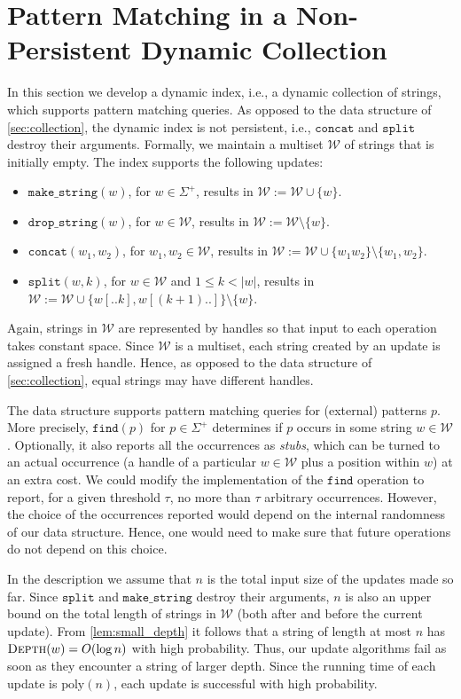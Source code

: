 \documentclass[a4paper]{article}
\theoremstyle{remark}
\newcommand{\makeop}{\mathtt{make\_string}}
\newcommand{\dropop}{\mathtt{drop\_string}}
\newcommand{\concop}{\mathtt{concat}}
\newcommand{\splitop}{\mathtt{split}}
\newcommand{\findop}{\mathtt{find}}
\newcommand{\depth}{\textsc{Depth}}
\newcommand{\str}{w}
\newcommand{\coll}{\mathcal{W}}
\newcommand{\poly}{\mathrm{poly}}
\begin{document}
\section{Pattern Matching in a Non-Persistent Dynamic Collection}\label{sec:pm}
In this section we develop a dynamic index, i.e., a dynamic collection
of strings, which supports pattern matching queries.
As opposed to the data structure of \cref{sec:collection}, the dynamic index is not persistent,
i.e., $\concop$ and $\splitop$ destroy their arguments.
Formally, we maintain a multiset $\coll$ of strings that is initially empty.
The index supports the following updates:
\begin{itemize}
  \item $\makeop(\str)$, for $\str\in \Sigma^+$, results in $\coll:=\coll\cup \{\str\}$.
      \item $\dropop(\str)$, for $\str\in \coll$, results in $\coll:=\coll\setminus \{\str\}$.
   \item $\concop(\str_1,\str_2)$, for $\str_1,\str_2\in \coll$, results in $\coll:=\coll\cup \{\str_1\str_2\}\setminus \{w_1,w_2\}$.
  \item $\splitop(\str,k)$, for $\str\in \coll$ and $1\leq k<|\str|$, results in
    $\coll:=\coll\cup \{\str[..k], \str[(k + 1)..]\}\setminus\{w\}$.
\end{itemize}

Again, strings in $\coll$ are represented by handles so that input to each operation takes constant space.
Since $\coll$ is a multiset, each string created by an update is assigned a fresh handle.
Hence, as opposed to the data structure of \cref{sec:collection}, equal strings may have different handles.

The data structure supports pattern matching queries for (external) patterns $p$.
More precisely, $\findop(p)$ for $p\in \Sigma^+$ determines
if $p$ occurs in some string $w\in \coll$.
Optionally, it also reports all the occurrences as \emph{stubs}, which can be turned to an actual occurrence
(a handle of a particular $w\in \coll$ plus a position within $w$) at an extra cost.
We could modify the implementation of the $\findop$ operation to report, for a given threshold $\tau$,
no more than $\tau$ arbitrary occurrences. However, the choice of the occurrences reported would depend on the internal randomness
of our data structure. Hence, one would need to make sure that future operations do not depend on this choice.


In the description we assume that $n$ is the total input size of the updates made so far.
Since $\splitop$ and $\makeop$ destroy their arguments, $n$ is also an upper bound on the total
length of strings in $\coll$ (both after and before the current update).
From \cref{lem:small_depth} it follows that a string of length at most $n$ has $\depth(\str) = O(\log n)$ with high probability.
Thus, our update algorithms fail as soon as they encounter a string of larger depth.
Since the running time of each update is $\poly(n)$, each update is successful with high probability.
\end{document}
